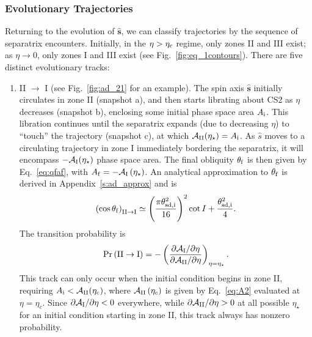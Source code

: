 \documentclass[twocolumn,twocolappendix]{aastex63}
\newcommand*{\pdil}[2]{\partial#1 / \partial#2}
\newcommand*{\bsmb}[1]{\boldsymbol{\mathbf{#1}}}
\newcommand*{\uv}[1]{\hat{\bsmb{#1}}}
\newcommand*{\p}[1]{\left(#1\right)}
\begin{document}
\subsubsection{Evolutionary Trajectories}\label{sss:evol_traj}

Returning to the evolution of $\uv{s}$, we can classify trajectories by the
sequence of separatrix encounters. Initially, in the $\eta > \eta_{\rm c}$
regime, only zones II and III exist; as $\eta \to 0$, only zones I and III exist
(see Fig.~\ref{fig:eq_1contours}). There are five distinct evolutionary tracks:
\begin{enumerate}
    \item II $\to$ I (see Fig.~\ref{fig:ad_21} for an example). The spin axis
        $\uv{s}$ initially circulates in zone II (snapshot a), and then starts
        librating about CS2 as $\eta$ decreases (snapshot b), enclosing some
        initial phase space area $A_{\rm i}$. This libration continues until the
        separatrix expands (due to decreasing $\eta$) to ``touch'' the
        trajectory (snapshot c), at which $\mathcal{A}_{\rm II}(\eta_\star) =
        A_{\rm i}$. As $\hat{s}$ moves to a circulating trajectory in zone I
        immediately bordering the separatrix, it will encompass
        $-\mathcal{A}_{\rm I}(\eta_\star)$ phase space area. The final obliquity
        $\theta_{\rm f}$ is then given by Eq.~\eqref{eq:qfaf}, with $A_{\rm f} =
        -\mathcal{A}_{\rm I}\p{\eta_\star}$. An analytical approximation to
        $\theta_{\rm f}$ is derived in Appendix~\ref{s:ad_approx} and is
        \begin{equation}
            \p{\cos \theta_{\rm f}}_{\rm II \to I} \simeq
                \p{\frac{\pi \theta_{\rm sd, i}^2}{16}}^2 \cot I
                    + \frac{\theta_{\rm sd, i}^2}{4}.\label{eq:qf_21_approx}
        \end{equation}
        The transition probability is
        \begin{equation}
            \Pr\p{\mathrm{II} \to \mathrm{I}} = -\p{
                \frac{\pdil{\mathcal{A}_{\rm I}}{\eta}}{\pdil{\mathcal{A}_{\rm
                    II}}{\eta}}} _{\eta = \eta_{\star}}.
        \end{equation}
        This track can only occur when the initial condition begins in zone II,
        requiring $A_{\rm i} < \mathcal{A}_{\rm II}(\eta_{\rm c})$, where
        $\mathcal{A}_{\rm II}\p{\eta_c}$ is given by Eq.~\eqref{eq:A2} evaluated
        at $\eta = \eta_c$. Since $\pdil{\mathcal{A}_{\rm I}}{\eta} < 0$
        everywhere, while $\pdil{\mathcal{A}_{\rm II}}{\eta} > 0$ at all
        possible $\eta_\star$ for an initial condition starting in zone II, this
        track always has nonzero probability.


\end{enumerate}
\end{document}
